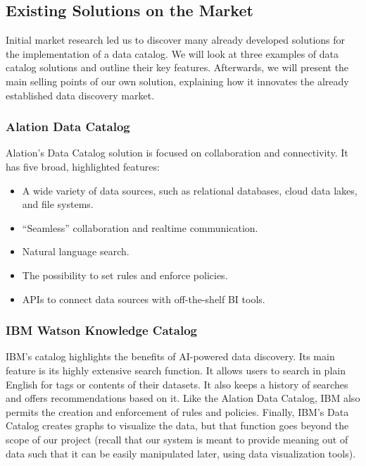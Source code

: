 \subsection{Existing Solutions on the Market}\label{subsec:existing_solutions_on_the_market}
Initial market research led us to discover many already developed solutions for the implementation of a data catalog.
We will look at three examples of data catalog solutions and outline their key features.
Afterwards, we will present the main selling points of our own solution, explaining how it innovates the already
established data discovery market.

\subsubsection{Alation Data Catalog~\cite{AlationDataCatalog}}
Alation's Data Catalog solution is focused on collaboration and connectivity.
It has five broad, highlighted features:
\begin{itemize}
    \item A wide variety of data sources, such as relational databases, cloud data lakes, and file systems.
    \item ``Seamless'' collaboration and realtime communication.
    \item Natural language search.
    \item The possibility to set rules and enforce policies.
    \item APIs to connect data sources with off-the-shelf BI tools.
\end{itemize}

\subsubsection{IBM Watson Knowledge Catalog~\cite{IBMWatsonKnowledgeCatalog}}
IBM's catalog highlights the benefits of AI-powered data discovery.
Its main feature is its highly extensive search function.
It allows users to search in plain English for tags or contents of their datasets.
It also keeps a history of searches and offers recommendations based on it.
Like the Alation Data Catalog, IBM also permits the creation and enforcement of rules and policies.
Finally, IBM's Data Catalog creates graphs to visualize the data, but that function goes beyond the scope of our project
(recall that our system is meant to provide meaning out of data such that it can be easily manipulated later, using data
visualization tools).

